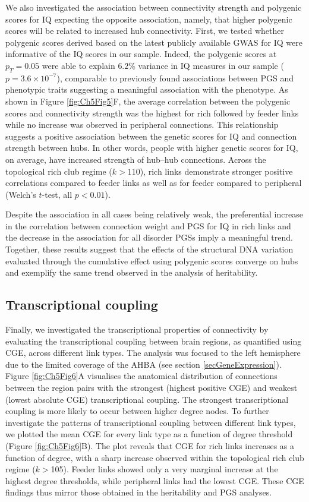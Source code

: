 We also investigated the association between connectivity strength and polygenic scores for IQ expecting the opposite association, namely, that higher polygenic scores will be related to increased hub connectivity. First, we tested whether polygenic scores derived based on the latest publicly available GWAS for IQ \citep{Savage2018} were informative of the IQ scores in our sample. Indeed, the polygenic scores at $p_{T} = 0.05$ were able to explain $6.2\%$ variance in IQ measures in our sample ($p = 3.6 \times 10^{-7}$), comparable to previously found associations between PGS and phenotypic traits \citep{Euesden2015} suggesting a meaningful association with the phenotype. As shown in Figure \ref{fig:Ch5Fig5}F, the average correlation between the polygenic scores and connectivity strength was the highest for rich followed by feeder links while no increase was observed in peripheral connections. This relationship suggests a positive association between the genetic scores for IQ and connection strength between hubs. In other words, people with higher genetic scores for IQ, on average, have increased strength of hub--hub connections. Across the topological rich club regime ($k > 110$), rich links demonstrate stronger positive correlations compared to feeder links as well as for feeder compared to peripheral (Welch's $t$-test, all $p<0.01$).


Despite the association in all cases being relatively weak, the preferential increase in the correlation between connection weight and PGS for IQ in rich links and the decrease in the association for all disorder PGSs imply a meaningful trend. Together, these results suggest that the effects of the structural DNA variation evaluated through the cumulative effect using polygenic scores converge on hubs and exemplify the same trend observed in the analysis of heritability.

\subsection{Transcriptional coupling}

Finally, we investigated the transcriptional properties of connectivity by evaluating the transcriptional coupling between brain regions, as quantified using CGE, across different link types. The analysis was focused to the left hemisphere due to the limited coverage of the AHBA (see section \ref{secGeneExpression}). Figure \ref{fig:Ch5Fig6}A visualises the anatomical distribution of connections between the region pairs with the strongest (highest positive CGE) and weakest (lowest absolute CGE) transcriptional coupling. The strongest transcriptional coupling is more likely to occur between higher degree nodes. To further investigate the patterns of transcriptional coupling between different link types, we plotted the mean CGE for every link type as a function of degree threshold (Figure \ref{fig:Ch5Fig6}B). The plot reveals that CGE for rich links increases as a function of degree, with a sharp increase observed within the topological rich club regime ($k > $105). Feeder links showed only a very marginal increase at the highest degree thresholds, while peripheral links had the lowest CGE. These CGE findings thus mirror those obtained in the heritability and PGS analyses.

